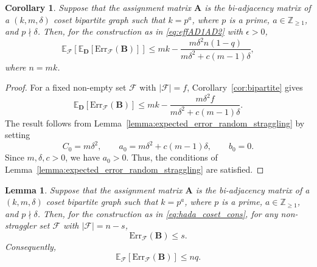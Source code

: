 \documentclass[journal,draftcls,onecolumn]{IEEEtran}
\theoremstyle{mystyle}
\newtheorem{lemma}{Lemma}
\newtheorem{cor}{Corollary}
\newcommand{\bfA}{\mathbf{A}}
\newcommand{\bfB}{\mathbf{B}}
\newcommand{\cF}{\mathcal{F}}
\begin{document}
\begin{cor}
\label{cor:expected_error_coset_strr}
Suppose that the assignment matrix $\mathbf{A}$ is the bi-adjacency matrix of a $(k,m,\delta)$ coset bipartite graph such that $k=p^a$, where $p$ is a prime, $a\in\mathbb{Z}_{\geq1}$, and $p\nmid\delta$. Then, for the construction as in \eqref{eq:effAD1AD2} with $\epsilon > 0$,
\[
\mathbb{E}_{\mathcal{F}}
\left[
\mathbb{E}_{\mathbf{D}}
\left[
\text{Err}_{\mathcal{F}}(\mathbf{B})
\right]
\right]
\leq
mk-
\frac{m\delta^2n(1-q)}
{m\delta^2+c(m-1)\delta},
\]
where $n=mk$.
\end{cor}

\begin{proof}
For a fixed non-empty set $\mathcal{F}$ with $|\mathcal{F}|=f$, Corollary~\ref{cor:bipartite} gives
\[
\mathbb{E}_{\mathbf{D}}
\left[
\text{Err}_{\mathcal{F}}(\mathbf{B})
\right]
\leq
mk-
\frac{m\delta^2f}
{m\delta^2+c(m-1)\delta}.
\]
The result follows from Lemma~\ref{lemma:expected_error_random_straggling} by setting
\[
C_0=m\delta^2,
\qquad
a_0=m\delta^2+c(m-1)\delta,
\qquad
b_0=0.
\]
Since $m,\delta,c>0$, we have $a_0>0$. Thus, the conditions of Lemma~\ref{lemma:expected_error_random_straggling} are satisfied.
\end{proof}

\begin{lemma}
\label{lemma:hada_coset_bound}
Suppose that the assignment matrix $\bfA$ is the bi-adjacency matrix of a
$(k,m,\delta)$ coset bipartite graph such that $k=p^a$, where $p$ is a prime,
$a\in\mathbb{Z}_{\geq 1}$, and $p\nmid\delta$. Then, for the construction as
in \eqref{eq:hada_coset_cons}, for any non-straggler set $\cF$ with
$|\cF|=n-s$,
\begin{equation}
\label{eq:Hada_Coset_err}
\text{Err}_{\cF}(\bfB)\leq s.
\end{equation}
Consequently,
\begin{equation}
\label{eq:Hada_Coset_exp_err}
\mathbb{E}_{\cF}\left[\text{Err}_{\cF}(\bfB)\right]\leq nq.
\end{equation}
\end{lemma}
\end{document}
